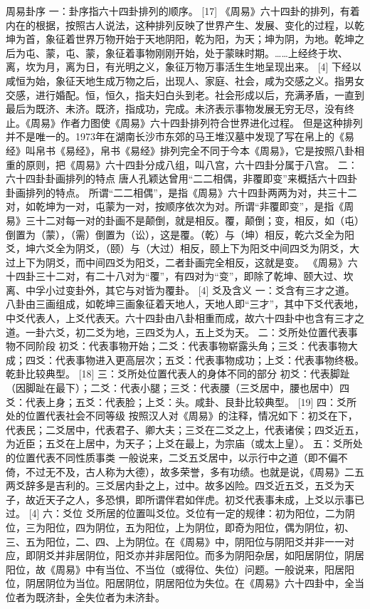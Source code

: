 \documentclass[a4paper,12pt,UTF8,twoside]{ctexbook}
\begin{document}
周易卦序
一：卦序指六十四卦排列的顺序。 [17]
《周易》六十四卦的排列，有着内在的根据，按照古人说法，这种排列反映了世界产生、发展、变化的过程，以乾坤为首，象征着世界万物开始于天地阴阳，乾为阳，为天；坤为阴，为地。乾坤之后为屯、蒙，屯、蒙，象征着事物刚刚开始，处于蒙昧时期。……上经终于坎、离，坎为月，离为日，有光明之义，象征万物万事活生生地呈现出来。 [4]
下经以咸恒为始，象征天地生成万物之后，出现人、家庭、社会，咸为交感之义。指男女交感，进行婚配。恒，恒久，指夫妇白头到老。社会形成以后，充满矛盾，一直到最后为既济、未济。既济，指成功，完成。未济表示事物发展无穷无尽，没有终止。《周易》作者力图使《周易》六十四卦排列符合世界进化过程。
但是这种排列并不是唯一的。1973年在湖南长沙市东郊的马王堆汉墓中发现了写在帛上的《易经》叫帛书《易经》，帛书《易经》排列完全不同于今本《周易》，它是按照八卦相重的原则，把《周易》六十四卦分成八组，叫八宫，六十四卦分属于八宫。
二：六十四卦卦画排列的特点
唐人孔颖达曾用“二二相偶，非覆即变”来概括六十四卦卦画排列的特点。
所谓“二二相偶”，是指《周易》六十四卦两两为对，共三十二对，如乾坤为一对，屯蒙为一对，按顺序依次为对。所谓“非覆即变”，是指《周易》三十二对每一对的卦画不是颠倒，就是相反。覆，颠倒；变，相反，如（屯）倒置为（蒙），（需）倒置为（讼），这是覆。（乾）与（坤）相反，乾六爻全为阳爻，坤六爻全为阴爻，（颐）与（大过）相反，颐上下为阳爻中间四爻为阴爻，大过上下为阴爻，而中间四爻为阳爻，二者卦画完全相反，这就是变。
《周易》六十四卦三十二对，有二十八对为“覆”，有四对为“变”，即除了乾坤、颐大过、坎离、中孚小过变卦外，其它与对皆为覆卦。 [4]
爻及含义
一：爻含有三才之道。
八卦由三画组成，如乾坤三画象征着天地人，天地人即“三才”，其中下爻代表地，中爻代表人，上爻代表天。六十四卦由八卦相重而成，故六十四卦中也含有三才之道。一卦六爻，初二爻为地，三四爻为人，五上爻为天。
二：爻所处位置代表事物不同阶段
初爻：代表事物开始；二爻：代表事物崭露头角；三爻：代表事物大成；四爻：代表事物进入更高层次；五爻：代表事物成功；上爻：代表事物终极。乾卦比较典型。 [18]
三：爻所处位置代表人的身体不同的部分
初爻：代表脚趾（因脚趾在最下）；二爻：代表小腿；三爻：代表腰（三爻居中，腰也居中）四爻：代表上身；五爻：代表脸；上爻：头。咸卦、艮卦比较典型。 [19]
四：爻所处的位置代表社会不同等级
按照汉人对《周易》的注释，情况如下：初爻在下，代表民；二爻居中，代表君子、卿大夫；三爻在二爻之上，代表诸侯；四爻近五，为近臣；五爻在上居中，为天子；上爻在最上，为宗庙（或太上皇）。
五：爻所处的位置代表不同性质事类
一般说来，二爻五爻居中，以示行中之道（即不偏不倚，不过无不及，古人称为大德），故多荣誉，多有功绩。也就是说，《周易》二五两爻辞多是吉利的。三爻居内卦之上，过中。故多凶险。四爻近五爻，五爻为天子，故近天子之人，多恐惧，即所谓伴君如伴虎。初爻代表事未成，上爻以示事已过。 [4]
六：爻位
爻所居的位置叫爻位。爻位有一定的规律：初为阳位，二为阴位，三为阳位，四为阴位，五为阳位，上为阴位，即奇为阳位，偶为阴位，初、三、五为阳位，二、四、上为阴位。在《周易》中，阴阳位与阴阳爻并非一一对应，即阴爻并非居阴位，阳爻亦并非居阳位。而多为阴阳杂居，如阳居阴位，阴居阳位，故《周易》中有当位、不当位（或得位、失位）问题。一般说来，阳居阳位，阴居阴位为当位。阳居阴位，阴居阳位为失位。在《周易》六十四卦中，全当位者为既济卦，全失位者为未济卦。
\end{document}

